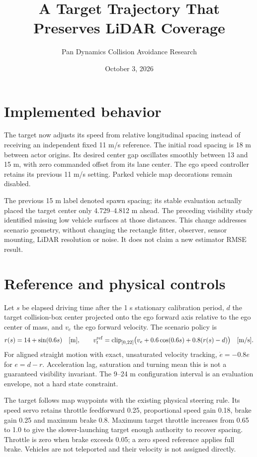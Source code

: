 \documentclass[11pt]{article}
\title{A Target Trajectory That Preserves LiDAR Coverage}
\author{Pan Dynamics Collision Avoidance Research}
\date{October 3, 2026}
\begin{document}
\maketitle

\section{Implemented behavior}
The target now adjusts its speed from relative longitudinal spacing instead
of receiving an independent fixed 11 m/s reference. The initial road spacing
is 18 m between actor origins. Its desired center gap oscillates smoothly
between 13 and 15 m, with zero commanded offset from its lane center.
The ego speed controller retains its previous 11 m/s setting. Parked vehicle
map decorations remain disabled.

The previous 15 m label denoted spawn spacing; its stable evaluation actually
placed the target center only 4.729--4.812 m ahead. The preceding visibility
study identified missing low vehicle surfaces at those distances. This change
addresses scenario geometry, without changing the rectangle fitter, observer,
sensor mounting, LiDAR resolution or noise. It does not claim a new estimator
RMSE result.

\section{Reference and physical controls}
Let $s$ be elapsed driving time after the 1 s stationary calibration period,
$d$ the target collision-box center projected onto the ego forward axis
relative to the ego center of mass, and $v_e$ the ego forward velocity.
The scenario policy is
\[
 r(s)=14+\sin(0.6s)\quad[\mathrm m],\qquad
 v_t^{\rm ref}=\operatorname{clip}_{[0,22]}
 \bigl(v_e+0.6\cos(0.6s)+0.8(r(s)-d)\bigr)\quad[\mathrm{m/s}].
\]
For aligned straight motion with exact, unsaturated velocity tracking,
$\dot e=-0.8e$ for $e=d-r$. Acceleration lag, saturation and turning mean this
is not a guaranteed visibility invariant. The 9--24 m configuration interval
is an evaluation envelope, not a hard state constraint.

The target follows map waypoints with the existing physical steering rule.
Its speed servo retains throttle feedforward 0.25, proportional speed gain
0.18, brake gain 0.25 and maximum brake 0.8. Maximum target throttle increases
from 0.65 to 1.0 to give the slower-launching target enough authority to
recover spacing. Throttle is zero when brake exceeds 0.05; a zero speed
reference applies full brake. Vehicles are not teleported and their velocity
is not assigned directly.
\end{document}
